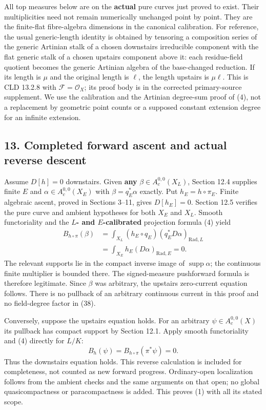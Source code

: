 \documentclass[
  11pt,
]{article}
\begin{document}
All top measures below are on the \textbf{actual} pure curves just
proved to exist. Their multiplicities need not remain numerically
unchanged point by point. They are the finite-flat fibre-algebra
dimensions in the canonical calibration. For reference, the usual
generic-length identity is obtained by tensoring a composition series of
the generic Artinian stalk of a chosen downstairs irreducible component
with the flat generic stalk of a chosen upstairs component above it: each
residue-field quotient becomes the generic Artinian algebra of the
base-changed reduction. If its length is \(\mu\) and the original length
is \(\ell\), the length upstairs is \(\mu\ell\). This is CLD 13.2.8 with
\(\mathcal F=\mathcal O_X\); its proof body is in the corrected primary-source supplement.
We use the calibration and the Artinian degree-sum proof of (4), not a
replacement by geometric point counts or a supposed constant extension
degree for an infinite extension.

\subsection{13. Completed forward ascent and actual reverse
descent}\label{completed-forward-ascent-and-actual-reverse-descent}

Assume \(D[h]=0\) downstairs. Given \textbf{any}
\(\beta\in A_c^{0,0}(X_L)\), Section 12.4 supplies finite \(E\) and
\(\alpha\in A_c^{0,0}(X_E)\) with \(\beta=q_E^*\alpha\) exactly. Put
\(h_E=h\circ\pi_E\). Finite algebraic ascent, proved in Sections 3--11,
gives \(D[h_E]=0\). Section 12.5 verifies the pure curve and ambient
hypotheses for both \(X_E\) and \(X_L\). Smooth functoriality and the
\textbf{\(L\)- and \(E\)-calibrated} projection formula (4) yield \[
 \begin{aligned}
 B_{h\circ\pi}(\beta)
 &=\int_{X_L}(h_E\circ q_E)(q_E^*D\alpha)_{\mathrm{Rad},L}\\
 &=\int_{X_E}h_E(D\alpha)_{\mathrm{Rad},E}
 =0.
 \end{aligned}                                             \tag{38}
\] The relevant supports lie in the compact inverse image of
\(\operatorname{supp}\alpha\); the continuous finite multiplier is
bounded there. The signed-measure pushforward formula is therefore
legitimate. Since \(\beta\) was arbitrary, the upstairs zero-current
equation follows. There is no pullback of an arbitrary continuous
current in this proof and no field-degree factor in (38).

Conversely, suppose the upstairs equation holds. For an arbitrary
\(\psi\in A_c^{0,0}(X)\) its pullback has compact support by Section
12.1. Apply smooth functoriality and (4) directly for \(L/K\): \[
             B_h(\psi)=B_{h\circ\pi}(\pi^*\psi)=0.        \tag{39}
\] Thus the downstairs equation holds. This reverse calculation is
included for completeness, not counted as new forward progress.
Ordinary-open localization follows from the ambient checks and the same
arguments on that open; no global quasicompactness or paracompactness is
added. This proves (1) with all its stated scope.
\end{document}

